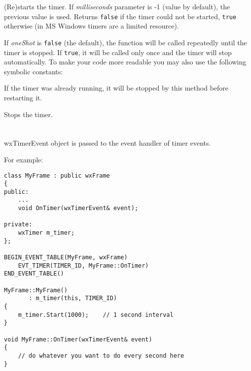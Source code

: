 \label{wxtimerstart}


(Re)starts the timer. If {\it milliseconds}\/ parameter is -1 (value by default),
the previous value is used. Returns {\tt false} if the timer could not be started,
{\tt true} otherwise (in MS Windows timers are a limited resource).

If {\it oneShot}\/ is {\tt false} (the default), the  
function will be called repeatedly until the timer is stopped. If {\tt true},
it will be called only once and the timer will stop automatically. To make your
code more readable you may also use the following symbolic constants:

\twocolwidtha{5cm}
\begin{twocollist}\itemsep=0pt
\end{twocollist}

If the timer was already running, it will be stopped by this method before
restarting it.

\label{wxtimerstop}


Stops the timer.

\section{}\label{wxtimerevent}

wxTimerEvent object is passed to the event handler of timer events.

For example:

\begin{verbatim}
class MyFrame : public wxFrame
{
public:
    ...
    void OnTimer(wxTimerEvent& event);

private:
    wxTimer m_timer;
};

BEGIN_EVENT_TABLE(MyFrame, wxFrame)
    EVT_TIMER(TIMER_ID, MyFrame::OnTimer)
END_EVENT_TABLE()

MyFrame::MyFrame()
       : m_timer(this, TIMER_ID)
{
    m_timer.Start(1000);    // 1 second interval
}

void MyFrame::OnTimer(wxTimerEvent& event)
{
    // do whatever you want to do every second here
}

\end{verbatim}

